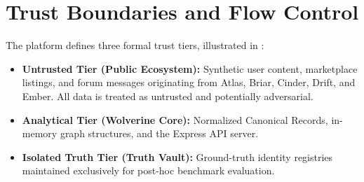 \section{Trust Boundaries and Flow Control}
\label{sec:sec-trust-boundaries}
The platform defines three formal trust tiers, illustrated in :
\begin{itemize}
    \item \textbf{Untrusted Tier (Public Ecosystem):} Synthetic user content, marketplace listings, and forum messages originating from Atlas, Briar, Cinder, Drift, and Ember. All data is treated as untrusted and potentially adversarial.
    \item \textbf{Analytical Tier (Wolverine Core):} Normalized Canonical Records, in-memory graph structures, and the Express API server.
    \item \textbf{Isolated Truth Tier (Truth Vault):} Ground-truth identity registries maintained exclusively for post-hoc benchmark evaluation.
\end{itemize}

